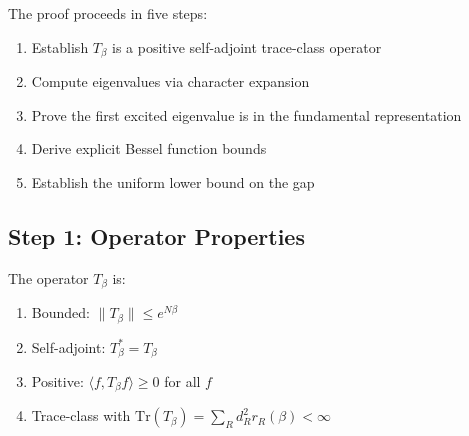 The proof proceeds in five steps:
\begin{enumerate}
\item Establish $T_\beta$ is a positive self-adjoint trace-class operator
\item Compute eigenvalues via character expansion
\item Prove the first excited eigenvalue is in the fundamental representation
\item Derive explicit Bessel function bounds
\item Establish the uniform lower bound on the gap
\end{enumerate}

\subsection{Step 1: Operator Properties}

\begin{lemma}
\label{lem:positive-sa}
The operator $T_\beta$ is:
\begin{enumerate}
\item Bounded: $\|T_\beta\| \leq e^{N\beta}$
\item Self-adjoint: $T_\beta^* = T_\beta$
\item Positive: $\langle f, T_\beta f \rangle \geq 0$ for all $f$
\item Trace-class with $\mathrm{Tr}(T_\beta) = \sum_R d_R^2 r_R(\beta) < \infty$
\end{enumerate}
\end{lemma}

